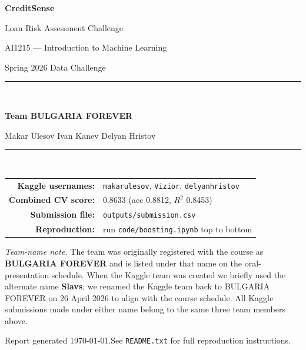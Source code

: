 \documentclass[11pt,a4paper]{article}
\begin{document}
\begin{titlepage}
    \centering
    \vspace*{3cm}
    {\Huge \textbf{CreditSense}\par}
    \vspace{0.3cm}
    {\LARGE Loan Risk Assessment Challenge\par}
    \vspace{2cm}
    {\large AI1215 --- Introduction to Machine Learning\par}
    {\large Spring 2026 Data Challenge\par}
    \vspace{3cm}
    \rule{0.6\textwidth}{0.6pt}\\[0.6em]
    {\Large \textbf{Team BULGARIA FOREVER}\par}
    \vspace{0.8em}
    {\large Makar Ulesov \quad Ivan Kanev \quad Delyan Hristov\par}
    \rule{0.6\textwidth}{0.6pt}\\[3cm]
    \begin{tabular}{rl}
        \textbf{Kaggle usernames:} & \texttt{makarulesov}, \texttt{Vizior}, \texttt{delyanhristov} \\
        \textbf{Combined CV score:} & 0.8633 (acc 0.8812, $R^2$ 0.8453) \\
        \textbf{Submission file:} & \texttt{outputs/submission.csv} \\
        \textbf{Reproduction:} & run \texttt{code/boosting.ipynb} top to bottom \\
    \end{tabular}
    \vfill
    {\footnotesize \textit{Team-name note.} The team was originally registered with the course as \textbf{BULGARIA FOREVER} and is listed under that name on the oral-presentation schedule. When the Kaggle team was created we briefly used the alternate name \textbf{Slavs}; we renamed the Kaggle team back to BULGARIA FOREVER on 26 April 2026 to align with the course schedule. All Kaggle submissions made under either name belong to the same three team members above.\par}
    \vspace{0.6em}
    {\small Report generated \today.\quad See \texttt{README.txt} for full reproduction instructions.}
\end{titlepage}
\end{document}
